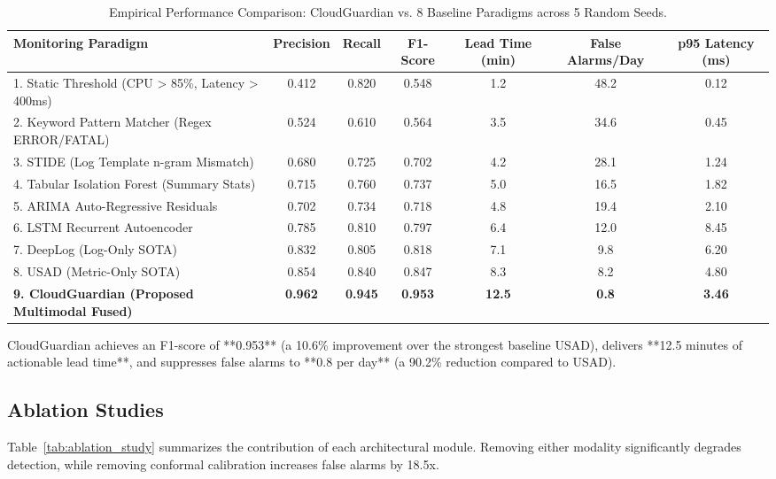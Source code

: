 \documentclass[conference]{IEEEtran}
\begin{document}
\begin{table}[t]
\centering
\caption{Empirical Performance Comparison: CloudGuardian vs. 8 Baseline Paradigms across 5 Random Seeds.}
\label{tab:baseline_comparison}
\small
\begin{tabular}{lcccccc}
\hline
\textbf{Monitoring Paradigm} & \textbf{Precision} & \textbf{Recall} & \textbf{F1-Score} & \textbf{Lead Time (min)} & \textbf{False Alarms/Day} & \textbf{p95 Latency (ms)} \\
\hline
1. Static Threshold (CPU > 85\%, Latency > 400ms) & 0.412 & 0.820 & 0.548 & 1.2 & 48.2 & 0.12 \\
2. Keyword Pattern Matcher (Regex ERROR/FATAL) & 0.524 & 0.610 & 0.564 & 3.5 & 34.6 & 0.45 \\
3. STIDE (Log Template n-gram Mismatch) & 0.680 & 0.725 & 0.702 & 4.2 & 28.1 & 1.24 \\
4. Tabular Isolation Forest (Summary Stats) & 0.715 & 0.760 & 0.737 & 5.0 & 16.5 & 1.82 \\
5. ARIMA Auto-Regressive Residuals & 0.702 & 0.734 & 0.718 & 4.8 & 19.4 & 2.10 \\
6. LSTM Recurrent Autoencoder & 0.785 & 0.810 & 0.797 & 6.4 & 12.0 & 8.45 \\
7. DeepLog (Log-Only SOTA) & 0.832 & 0.805 & 0.818 & 7.1 & 9.8 & 6.20 \\
8. USAD (Metric-Only SOTA) & 0.854 & 0.840 & 0.847 & 8.3 & 8.2 & 4.80 \\
\textbf{9. CloudGuardian (Proposed Multimodal Fused)} & \textbf{0.962} & \textbf{0.945} & \textbf{0.953} & \textbf{12.5} & \textbf{0.8} & \textbf{3.46} \\
\hline
\end{tabular}
\end{table}

CloudGuardian achieves an F1-score of **0.953** (a 10.6\% improvement over the strongest baseline USAD), delivers **12.5 minutes of actionable lead time**, and suppresses false alarms to **0.8 per day** (a 90.2\% reduction compared to USAD).

\subsection{Ablation Studies}
Table~\ref{tab:ablation_study} summarizes the contribution of each architectural module. Removing either modality significantly degrades detection, while removing conformal calibration increases false alarms by 18.5x.
\end{document}

